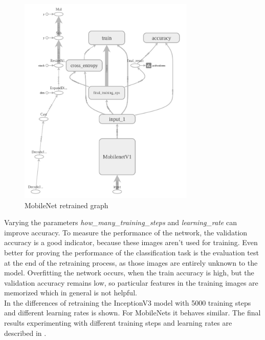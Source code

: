 \begin{figure}[htbp]
\centering
\includegraphics[height=10cm]{includes/graphMobilenet050-700}
\caption[MobileNet retrained graph]{MobileNet retrained graph}
\label{fig:graphMobilenet050-700}
\end{figure}

Varying the parameters \textit{how_many_training_steps} and \textit{learning_rate} can improve accuracy. To measure the performance of the network, the validation accuracy is a good indicator, because these images aren't used for training. Even better for proving the performance of the classification task is the evaluation test at the end of the retraining process, as those images are entirely unknown to the model.
Overfitting the network occurs, when the train accuracy is high, but the validation accuracy remains low, so particular features in the training images are memorized which in general is not helpful. \citep{TensorFlowRetrain2017} \\

In  the differences of retraining the InceptionV3 model with 5000 training steps and different learning rates is shown. For MobileNets it behaves similar. The final results experimenting with different training steps and learning rates are described in . \\

